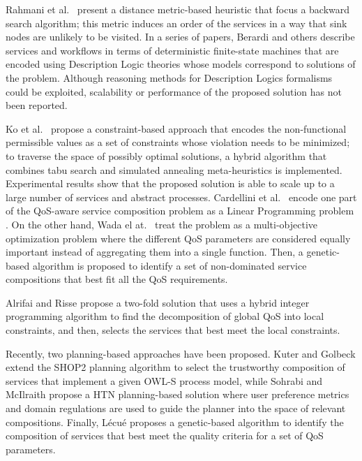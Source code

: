 \documentclass{llncs}
\begin{document}
Rahmani et al.\ \cite{rahmani08} present a distance metric-based heuristic
that focus a backward search algorithm; this metric induces an order of the
services in a way that sink nodes are unlikely to be visited.
In a series of papers, Berardi and others \cite{berardi05,berardi08,berardi06}
describe services and workflows in terms of deterministic finite-state machines
that are encoded using Description Logic theories whose models correspond to
solutions of the problem. Although reasoning methods for Description Logics
formalisms could be exploited, scalability or performance of the proposed
solution has not been reported.

Ko et al.\ \cite{myoung08} propose a constraint-based approach that encodes the
non-functional permissible values as a set of constraints whose violation needs
to be minimized; to traverse the space of possibly optimal solutions, a hybrid
algorithm that combines tabu search and simulated annealing meta-heuristics is
implemented. Experimental results show that the proposed solution is able to
scale up to a large number of services and abstract processes.
Cardellini et al.\ \cite{cardellini07} encode one part of the QoS-aware service
composition problem as a Linear Programming problem \cite{cardellini07}.
On the other hand, Wada el at.\ \cite{Hiroshi2008} treat the problem as a 
multi-objective optimization problem where the different QoS parameters are
considered equally important instead of aggregating them into a single function.
Then, a genetic-based algorithm is proposed to identify a set of non-dominated
service compositions that best fit all the QoS requirements.

Alrifai and Risse \cite{alrifaiR09} propose a two-fold solution that uses a
hybrid integer programming algorithm to find the decomposition of global QoS
into local constraints, and then, selects the services that best meet the local
constraints.   

Recently, two planning-based approaches have been proposed.
Kuter and Golbeck \cite{kuterG09} extend the SHOP2 planning algorithm to select
the trustworthy composition of services that implement a given OWL-S process model,
while Sohrabi and McIlraith \cite{sohrabiM09} propose a HTN planning-based solution
where user preference metrics and domain regulations are used to guide the planner
into the space of relevant compositions.
Finally, L\'ecu\'e \cite{lecue09} proposes a genetic-based algorithm to identify
the composition of services that best meet the quality criteria for a set of QoS
parameters.  
\end{document}

